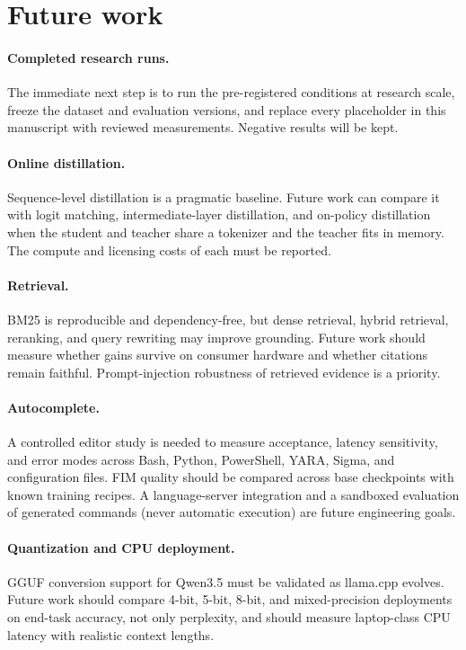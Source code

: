 \section{Future work}
\label{sec:future}

\paragraph{Completed research runs.}
The immediate next step is to run the pre-registered conditions at research
scale, freeze the dataset and evaluation versions, and replace every placeholder
in this manuscript with reviewed measurements. Negative results will be kept.

\paragraph{Online distillation.}
Sequence-level distillation is a pragmatic baseline. Future work can compare it
with logit matching, intermediate-layer distillation, and on-policy distillation
when the student and teacher share a tokenizer and the teacher fits in memory.
The compute and licensing costs of each must be reported.

\paragraph{Retrieval.}
BM25 is reproducible and dependency-free, but dense retrieval, hybrid retrieval,
reranking, and query rewriting may improve grounding. Future work should measure
whether gains survive on consumer hardware and whether citations remain faithful.
Prompt-injection robustness of retrieved evidence is a priority.

\paragraph{Autocomplete.}
A controlled editor study is needed to measure acceptance, latency sensitivity,
and error modes across Bash, Python, PowerShell, YARA, Sigma, and configuration
files. FIM quality should be compared across base checkpoints with known training
recipes. A language-server integration and a sandboxed evaluation of generated
commands (never automatic execution) are future engineering goals.

\paragraph{Quantization and CPU deployment.}
GGUF conversion support for Qwen3.5 must be validated as llama.cpp evolves.
Future work should compare 4-bit, 5-bit, 8-bit, and mixed-precision deployments
on end-task accuracy, not only perplexity, and should measure laptop-class CPU
latency with realistic context lengths.

